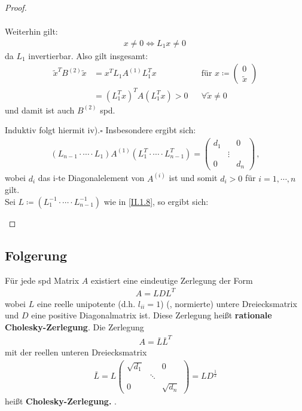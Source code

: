\documentclass[ngerman,fontsize=11pt, paper=a4, parskip=half, titlepage=true, toc=bib]{scrbook}
\begin{document}
\begin{proof}
\begin{enumerate}[i)]
\begin{align*}
			\end{align*}
			Weiterhin gilt:
			\begin{gather*}
				x\neq 0 \Leftrightarrow L_1 x\neq 0 \,
			\end{gather*}
			da $L_1$ invertierbar. Also gilt insgesamt:
			\begin{align*}
				\widetilde{x}^TB^{(2)} \widetilde{x} &= x^T L_1A^{(1)}L_1^Tx
					 &&  \text{für } x\coloneqq \begin{pmatrix}	0 \\ \widetilde{x}\end{pmatrix}\\
				&= (L_1^Tx)^TA(L_1^Tx) > 0
					&& \forall \widetilde{x}\neq 0 
			\end{align*}
			und damit ist auch $B^{(2)}$ spd.
			
			Induktiv folgt hiermit iv).\hfill $\square$
			Insbesondere ergibt sich: 
			\begin{gather*}
				(L_{n-1}\cdot \cdots\cdot L_1)A^{(1)}(L_1^T\cdot \cdots \cdot L_{n-1}^T) 
					= \begin{pmatrix} d_1 & & 0 \\ &\vdots& \\ 0&& d_n\end{pmatrix} \, ,
			\end{gather*}
			wobei $d_i$ das i-te Diagonalelement von $A^{(i)}$ ist und somit $d_i>0$ für $ i= 1, \cdots , n$ gilt. \\
			
			Sei $L\coloneqq (L_1^{-1}\cdot \cdots \cdot L_{n-1}^{-1})$ wie in \eqref{II.1.8}, so ergibt sich:
		\end{enumerate}
\end{proof}		

		\subsection{Folgerung} \label{4.2.2}
		Für jede spd Matrix $A$ existiert eine eindeutige Zerlegung der Form 
			\begin{gather*}
				A= LDL^T
			\end{gather*}
		wobei $L$ eine reelle unipotente (d.h. $l_{ii}=1$)  (, normierte)  untere 
		Dreiecksmatrix  und $D$ eine positive Diagonalmatrix ist. 
		Diese Zerlegung heißt \textbf{rationale Cholesky-Zerlegung}. Die Zerlegung
		\begin{gather}
			A= \bar{L}\bar{L}^T 
	\label{IV.2.2}
		\end{gather}
		mit der reellen unteren Dreiecksmatrix
		\begin{gather*}
			\bar{L} = L \begin{pmatrix}
			\sqrt{d_1} &&0 \\
			& \ddots & \\
			0&& \sqrt{d_n}
			\end{pmatrix} = LD^{\frac{1}{2}}
		\end{gather*}
		heißt \textbf{Cholesky-Zerlegung.} .
		
\end{document}
